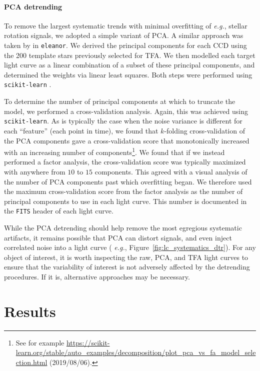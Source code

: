 \documentclass[12pt,twocolumn,tighten]{aastex62}
\begin{document}
\paragraph{PCA detrending}

To remove the largest systematic trends with minimal overfitting of
{\it e.g.}, stellar rotation signals, we adopted a simple variant of
PCA.  A similar approach was taken by \citet{feinstein_eleanor_2019}
in \texttt{eleanor}.  We derived the principal components for each CCD
using the 200 template stars previously selected for TFA.  We then
modelled each target light curve as a linear combination of a subset
of these principal components, and determined the weights via linear
least squares. Both steps were performed using \texttt{scikit-learn}
\citep{sklearn_2011}.

To determine the number of principal components at which to truncate
the model, we performed a cross-validation analysis.  Again, this was
achieved using \texttt{scikit-learn}.  As is typically the case when
the noise variance is different for each ``feature'' (each point in
time), we found that $k$-folding cross-validation of the PCA
components gave a cross-validation score that monotonically increased
with an increasing number of components\footnote{See for example
\url{https://scikit-learn.org/stable/auto_examples/decomposition/plot_pca_vs_fa_model_selection.html}
(2019/08/06).}.  We found that if we instead performed a factor
analysis, the cross-validation score was typically maximized with
anywhere from $10$ to $15$ components.  This agreed with a visual
analysis of the number of PCA components past which overfitting began.
We therefore used the maximum cross-validation score from the factor
analysis as the number of principal components to use in each light
curve.  This number is documented in the \texttt{FITS} header of each
light curve.

While the PCA detrending should help remove the most egregious
systematic artifacts, it remains possible that PCA can distort
signals, and even inject correlated noise into a light curve ({\it
e.g.}, Figure~\ref{fig:lc_systematics_dtr}).  For any object of
interest, it is worth inspecting the raw, PCA, and TFA light curves to
ensure that the variability of interest is not adversely affected by
the detrending procedures.  If it is, alternative approaches may be
necessary.


\section{Results}
\label{sec:results}
\end{document}
